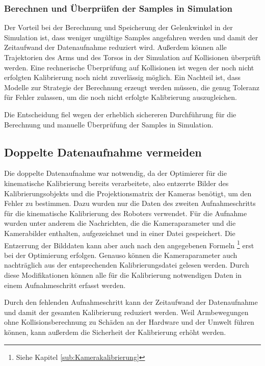 \subsubsection{Berechnen und Überprüfen der Samples in Simulation}
\label{ssub:Berechnen und Überprüfen der Samples in Simulation}

Der Vorteil bei der Berechnung und Speicherung der
Gelenkwinkel in der Simulation ist, dass weniger ungültige Samples angefahren werden
und damit der Zeitaufwand der Datenaufnahme reduziert wird. Außerdem können alle
Trajektorien des Arms und des Torsos in der Simulation auf Kollisionen überprüft
werden. Eine rechnerische Überprüfung auf Kollisionen ist wegen der noch nicht 
erfolgten Kalibrierung noch nicht zuverlässig möglich. Ein Nachteil ist, dass
Modelle zur Strategie der Berechnung erzeugt werden müssen, die genug Toleranz für Fehler zulassen, um die 
noch nicht erfolgte Kalibrierung auszugleichen.

Die Entscheidung fiel wegen der erheblich sichereren Durchführung für die Berechnung
und manuelle Überprüfung der Samples in Simulation. 



\subsection{Doppelte Datenaufnahme vermeiden}
\label{sub:Doppelte Datenaufnahme vermeiden}

Die doppelte Datenaufnahme war notwendig, da der Optimierer für die kinematische
Kalibrierung bereits verarbeitete, also entzerrte Bilder des
Kalibrierungsobjekts und die Projektionsmatrix der Kameras benötigt, um den Fehler
zu bestimmen. Dazu wurden nur die Daten des zweiten Aufnahmeschritts für die 
kinematische Kalibrierung des Roboters verwendet. Für die Aufnahme wurden unter
anderem die Nachrichten, die die Kameraparameter und die Kamerabilder enthalten,
aufgezeichnet und in einer Datei gespeichert. Die Entzerrung der Bilddaten kann
aber auch nach den angegebenen Formeln \footnote{Siehe Kapitel \ref{sub:Kamerakalibrierung}} erst bei
der Optimierung erfolgen. Genauso können die Kameraparameter auch nachträglich
aus der entsprechenden Kalibrierungsdatei gelesen werden. Durch diese Modifikationen
können alle für die Kalibrierung notwendigen Daten in einem Aufnahmeschritt 
erfasst werden.

Durch den fehlenden Aufnahmeschritt kann der Zeitaufwand der Datenaufnahme 
und damit der gesamten Kalibrierung reduziert werden.
Weil Armbewegungen ohne Kollisionsberechnung zu Schäden an der Hardware und der
Umwelt führen können, kann außerdem die Sicherheit der Kalibrierung erhöht werden.

